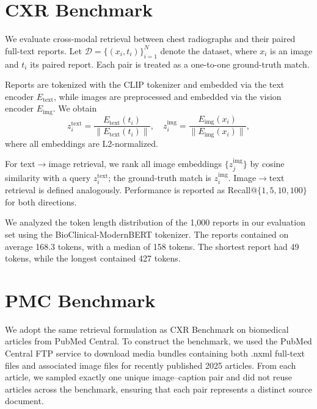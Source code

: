 

\section{CXR Benchmark}
We evaluate cross-modal retrieval between chest radiographs and their paired full-text reports. 
Let $\mathcal{D} = \{(x_i, t_i)\}_{i=1}^N$ denote the dataset, where $x_i$ is an image and $t_i$ its paired report. 
Each pair is treated as a one-to-one ground-truth match. 

Reports are tokenized with the CLIP tokenizer and embedded via the text encoder $E_{\text{text}}$, while images are preprocessed and embedded via the vision encoder $E_{\text{img}}$. 
We obtain
\[
z^{\text{text}}_i = \frac{E_{\text{text}}(t_i)}{\|E_{\text{text}}(t_i)\|}, \quad 
z^{\text{img}}_i = \frac{E_{\text{img}}(x_i)}{\|E_{\text{img}}(x_i)\|},
\]
where all embeddings are L2-normalized. 

For text$\to$image retrieval, we rank all image embeddings $\{z^{\text{img}}_j\}$ by cosine similarity with a query $z^{\text{text}}_i$; the ground-truth match is $z^{\text{img}}_i$. 
Image$\to$text retrieval is defined analogously. 
Performance is reported as Recall@$\{1,5,10,100\}$ for both directions.

We analyzed the token length distribution of the 1,000 reports in our evaluation set using the BioClinical-ModernBERT tokenizer. The reports contained on average 168.3 tokens, with a median of 158 tokens. The shortest report had 49 tokens, while the longest contained 427 tokens.

\section{PMC Benchmark}
We adopt the same retrieval formulation as CXR Benchmark on biomedical articles from PubMed Central. To construct the benchmark, we used the PubMed Central FTP service to download media bundles containing both .nxml full-text files and associated image files for recently published 2025 articles. From each article, we sampled exactly one unique image–caption pair and did not reuse articles across the benchmark, ensuring that each pair represents a distinct source document.

